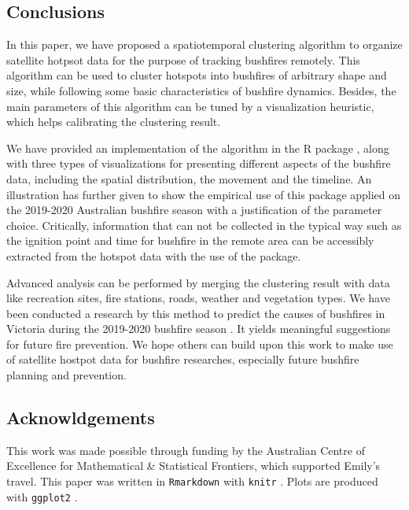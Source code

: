 \hypertarget{conclusions}{%
\subsection{Conclusions}\label{conclusions}}

In this paper, we have proposed a spatiotemporal clustering algorithm to
organize satellite hotpsot data for the purpose of tracking bushfires
remotely. This algorithm can be used to cluster hotspots into bushfires
of arbitrary shape and size, while following some basic characteristics
of bushfire dynamics. Besides, the main parameters of this algorithm can
be tuned by a visualization heuristic, which helps calibrating the
clustering result.

We have provided an implementation of the algorithm in the R package
, along with three types of visualizations for
presenting different aspects of the bushfire data, including the spatial
distribution, the movement and the timeline. An illustration has further
given to show the empirical use of this package applied on the 2019-2020
Australian bushfire season with a justification of the parameter choice.
Critically, information that can not be collected in the typical way
such as the ignition point and time for bushfire in the remote area can
be accessibly extracted from the hotspot data with the use of the
package.

Advanced analysis can be performed by merging the clustering result with
data like recreation sites, fire stations, roads, weather and vegetation
types. We have been conducted a research by this method to predict the
causes of bushfires in Victoria during the 2019-2020 bushfire season
\citep{conart}. It yields meaningful suggestions for future fire
prevention. We hope others can build upon this work to make use of
satellite hostpot data for bushfire researches, especially future
bushfire planning and prevention.

\hypertarget{acknowldgements}{%
\subsection{Acknowldgements}\label{acknowldgements}}

This work was made possible through funding by the Australian Centre of
Excellence for Mathematical \& Statistical Frontiers, which supported
Emily's travel. This paper was written in \texttt{Rmarkdown}
\citep{rmarkdown_pkg, rmarkdown, rmarkdown_cookbook} with \texttt{knitr}
\citep{knitr_pkg, knitr}. Plots are produced with \texttt{ggplot2}
\citep{ggplot2}.

